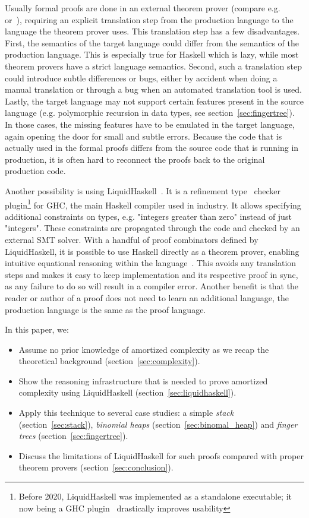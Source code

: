 \documentclass[sigplan,screen]{acmart}
\begin{document}
Usually formal proofs are done in an external theorem prover (compare e.g.~\cite{complexity_coq} or~\cite{complexity_isabelle}), requiring an explicit translation step from the production language to the language the theorem prover uses. This translation step has a few disadvantages. First, the semantics of the target language could differ from the semantics of the production language. This is especially true for Haskell which is lazy, while most theorem provers have a strict language semantics. Second, such a translation step could introduce subtle differences or bugs, either by accident when doing a manual translation or through a bug when an automated translation tool is used. Lastly, the target language may not support certain features present in the source language (e.g. polymorphic recursion in data types, see section~\ref{sec:fingertree}). In those cases, the missing features have to be emulated in the target language, again opening the door for small and subtle errors. Because the code that is actually used in the formal proofs differs from the source code that is running in production, it is often hard to reconnect the proofs back to the original production code.

Another possibility is using LiquidHaskell~\cite{liquidhaskell}. It is a refinement type~\cite{refinement_types} checker plugin\footnote{Before 2020, LiquidHaskell was implemented as a standalone executable; it now being a GHC plugin~\cite{lh_plugin} drastically improves usability} for GHC, the main Haskell compiler used in industry. It allows specifying additional constraints on types, e.g. "integers greater than zero" instead of just "integers". These constraints are propagated through the code and checked by an external SMT solver. With a handful of proof combinators defined by LiquidHaskell, it is possible to use Haskell directly as a theorem prover, enabling intuitive equational reasoning within the language~\cite{tpfa}. This avoids any translation steps and makes it easy to keep implementation and its respective proof in sync, as any failure to do so will result in a compiler error. Another benefit is that the reader or author of a proof does not need to learn an additional language, the production language is the same as the proof language.

In this paper, we:
\begin{itemize}
\item{Assume no prior knowledge of amortized complexity as we recap the theoretical background (section~\ref{sec:complexity}).}
\item{Show the reasoning infrastructure that is needed to prove amortized complexity using LiquidHaskell (section~\ref{sec:liquidhaskell}).}
\item{Apply this technique to several case studies: a simple \textit{stack} (section~\ref{sec:stack}), \textit{binomial heaps} (section~\ref{sec:binomal_heap}) and \textit{finger trees} (section~\ref{sec:fingertree}).}
\item{Discuss the limitations of LiquidHaskell for such proofs compared with proper theorem provers (section~\ref{sec:conclusion}).}
\end{itemize}
\end{document}
